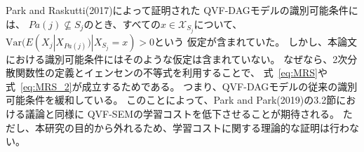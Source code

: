 Park and Raskutti(2017)\cite{Park2017-hw}によって証明された
QVF-DAGモデルの識別可能条件には、
$Pa(j) \nsubseteq S_j$のとき、すべての$x \in \mathcal X_{S_j}$について、
$\mathrm{Var}(E(X_j | X_{Pa(j)}) | X_{S_j} = x) > 0$という
仮定が含まれていた。
しかし、本論文における識別可能条件にはそのような仮定は含まれていない。
なぜなら、2次分散関数性の定義とイェンセンの不等式を利用することで、
式~\eqref{eq:MRS}や式~\eqref{eq:MRS_2}が成立するためである。
つまり、QVF-DAGモデルの従来の識別可能条件\cite{Park2017-hw}を緩和している。
このことによって、Park and Park(2019)\cite{Park2019-qy}の3.2節における議論と同様に
QVF-SEMの学習コストを低下させることが期待される。
ただし、本研究の目的から外れるため、学習コストに関する理論的な証明は行わない。
